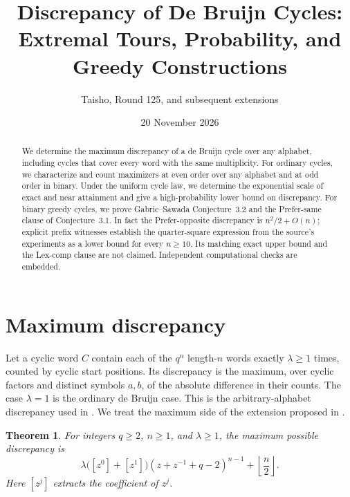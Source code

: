 \documentclass[11pt]{article}
\title{Discrepancy of De Bruijn Cycles:\\ Extremal Tours, Probability, and Greedy Constructions}
\author{Taisho, Round 125, and subsequent extensions}
\date{20 November 2026}
\newtheorem{theorem}{Theorem}
\begin{document}
\maketitle
\begin{abstract}
We determine the maximum discrepancy of a de Bruijn cycle over
any alphabet, including cycles that cover every word with the
same multiplicity. For ordinary cycles, we characterize and count
maximizers at even order over any alphabet and at odd order in
binary. Under the uniform cycle law, we determine the exponential
scale of exact and near attainment and give a high-probability
lower bound on discrepancy. For binary greedy cycles, we prove
Gabric--Sawada Conjecture~3.2 and the Prefer-same clause of
Conjecture~3.1. In fact the Prefer-opposite discrepancy is
\(n^2/2+O(n)\); explicit prefix witnesses establish the quarter-square
expression from the source's experiments as a lower bound for every
\(n\ge10\). Its matching exact upper bound and the Lex-comp clause
are not claimed. Independent computational checks are embedded.
\end{abstract}

\section{Maximum discrepancy}
\label{sec:maximum}

Let a cyclic word \(C\) contain each of the \(q^n\) length-\(n\) words
exactly \(\lambda\ge1\) times, counted by cyclic start positions.
Its discrepancy is the maximum, over cyclic factors and distinct
symbols \(a,b\), of the absolute difference in their counts.
The case \(\lambda=1\) is the ordinary de Bruijn case. This is the
arbitrary-alphabet discrepancy used in \cite{ABM}. We treat the
maximum side of the extension proposed in \cite[Section 7, item 5]{GabricSawada}.

\begin{theorem}\label{thm:maximum}
For integers \(q\ge2\), \(n\ge1\), and \(\lambda\ge1\), the maximum
possible discrepancy is
\[
\lambda\bigl([z^0]+[z^1]\bigr)(z+z^{-1}+q-2)^{n-1}
+\left\lfloor \frac n2\right\rfloor.
\]
Here \([z^j]\) extracts the coefficient of \(z^j\).
\end{theorem}
\end{document}
